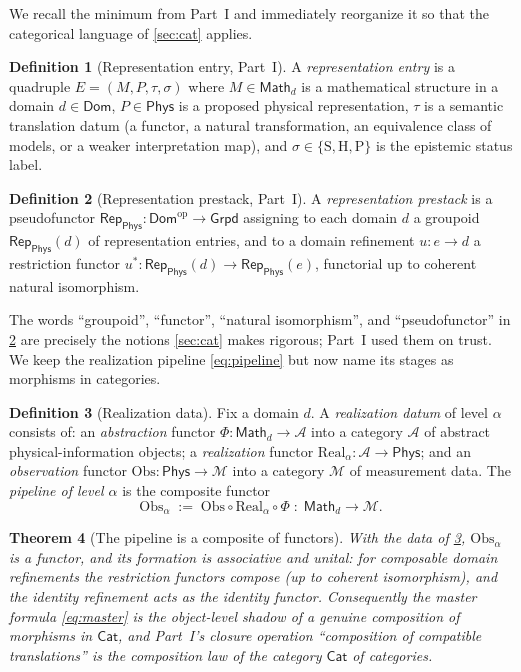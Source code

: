 \documentclass[12pt]{article}
\newtheorem{theorem}{Theorem}[section]
\theoremstyle{definition}
\newtheorem{definition}[theorem]{Definition}
\theoremstyle{remark}
\newcommand{\Dom}{\mathsf{Dom}}
\newcommand{\Phys}{\mathsf{Phys}}
\newcommand{\Math}{\mathsf{Math}}
\newcommand{\Cat}{\mathsf{Cat}}
\newcommand{\Grpd}{\mathsf{Grpd}}
\newcommand{\Rep}{\mathsf{Rep}}
\newcommand{\Real}{\mathrm{Real}}
\newcommand{\Obs}{\mathrm{Obs}}
\newcommand{\op}{\mathrm{op}}
\begin{document}
We recall the minimum from Part~I and immediately reorganize it so that the
categorical language of \cref{sec:cat} applies.

\begin{definition}[Representation entry, {Part~I}]
\label{def:entry}
A \emph{representation entry} is a quadruple $E=(M,P,\tau,\sigma)$ where
$M\in\Math_d$ is a mathematical structure in a domain $d\in\Dom$, $P\in\Phys$ is
a proposed physical representation, $\tau$ is a semantic translation datum (a
functor, a natural transformation, an equivalence class of models, or a weaker
interpretation map), and $\sigma\in\{\mathrm{S},\mathrm{H},\mathrm{P}\}$ is the
epistemic status label.
\end{definition}

\begin{definition}[Representation prestack, {Part~I}]
\label{def:prestack}
A \emph{representation prestack} is a pseudofunctor
$\Rep_{\Phys}:\Dom^{\op}\to\Grpd$ assigning to each domain $d$ a groupoid
$\Rep_{\Phys}(d)$ of representation entries, and to a domain refinement
$u:e\to d$ a restriction functor $u^{*}:\Rep_{\Phys}(d)\to\Rep_{\Phys}(e)$,
functorial up to coherent natural isomorphism.
\end{definition}

The words ``groupoid'', ``functor'', ``natural isomorphism'', and
``pseudofunctor'' in \cref{def:prestack} are precisely the notions
\cref{sec:cat} makes rigorous; Part~I used them on trust. We keep the realization
pipeline \eqref{eq:pipeline} but now name its stages as morphisms in categories.

\begin{definition}[Realization data]
\label{def:realization}
Fix a domain $d$. A \emph{realization datum} of level $\alpha$ consists of:
an \emph{abstraction} functor $\Phi:\Math_d\to\mathcal{A}$ into a category
$\mathcal{A}$ of abstract physical-information objects; a \emph{realization}
functor $\Real_\alpha:\mathcal{A}\to\Phys$; and an \emph{observation} functor
$\Obs:\Phys\to\mathcal{M}$ into a category $\mathcal{M}$ of measurement data. The
\emph{pipeline of level $\alpha$} is the composite functor
\[
\Obs_\alpha \;:=\; \Obs\circ\Real_\alpha\circ\Phi \;:\; \Math_d\longrightarrow\mathcal{M}.
\]
\end{definition}

\begin{theorem}[The pipeline is a composite of functors]
\label{thm:pipeline-functor}
With the data of \cref{def:realization}, $\Obs_\alpha$ is a functor, and its
formation is associative and unital: for composable domain refinements the
restriction functors compose (up to coherent isomorphism), and the identity
refinement acts as the identity functor. Consequently the master formula
\eqref{eq:master} is the object-level shadow of a genuine composition of
morphisms in $\Cat$, and Part~I's closure operation ``composition of compatible
translations'' is the composition law of the category $\Cat$ of categories.
\end{theorem}
\end{document}
